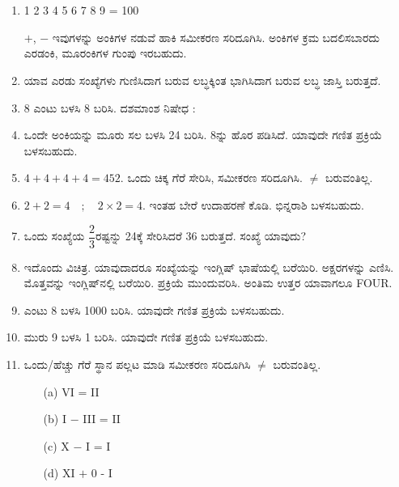 \chapter{}\label{chap8}

\begin{enumerate}
\renewcommand{\labelenumi}{\bf\theenumi.}
\itemsep=5pt

\item 1 2 3 4 5 6 7 8 9 = 100

$+$, $-$ ಇವುಗಳನ್ನು ಅಂಕಿಗಳ ನಡುವೆ ಹಾಕಿ ಸಮೀಕರಣ ಸರಿದೂಗಿಸಿ. ಅಂಕಿಗಳ ಕ್ರಮ ಬದಲಿಸಬಾರದು ಎರಡಂಕಿ, ಮೂರಂಕಿಗಳ ಗುಂಪು ಇರಬಹುದು. 

\item ಯಾವ ಎರಡು ಸಂಖ್ಯೆಗಳು ಗುಣಿಸಿದಾಗ ಬರುವ ಲಬ್ಧಕ್ಕಿಂತ ಭಾಗಿಸಿದಾಗ ಬರುವ ಲಬ್ಧ ಜಾಸ್ತಿ ಬರುತ್ತದೆ. 

\item 8 ಎಂಟು ಬಳಸಿ 8 ಬರಿಸಿ. ದಶಮಾಂಶ ನಿಷೇಧ :

\item ಒಂದೇ ಅಂಕಿಯನ್ನು ಮೂರು ಸಲ ಬಳಸಿ 24 ಬರಿಸಿ. 8ನ್ನು ಹೊರ ಪಡಿಸಿದೆ. ಯಾವುದೇ ಗಣಿತ ಪ್ರಕ್ರಿಯೆ ಬಳಸಬಹುದು. 

\item $4 + 4 + 4 + 4 = 452$. ಒಂದು ಚಿಕ್ಕ ಗೆರೆ ಸೇರಿಸಿ, ಸಮೀಕರಣ ಸರಿದೂಗಿಸಿ. $\neq$ ಬರುವಂತಿಲ್ಲ. 

\item $2 + 2 = 4\quad;\quad 2\times 2 = 4$. ಇಂತಹ ಬೇರೆ ಉದಾಹರಣೆ ಕೊಡಿ. ಭಿನ್ನರಾಶಿ ಬಳಸಬಹುದು. 

\item ಒಂದು ಸಂಖ್ಯೆಯ $\dfrac{2}{3}$ರಷ್ಟನ್ನು 24ಕ್ಕೆ ಸೇರಿಸಿದರೆ 36 ಬರುತ್ತದೆ. ಸಂಖ್ಯೆ ಯಾವುದು? 

\item ಇದೊಂದು ವಿಚಿತ್ರ. ಯಾವುದಾದರೂ ಸಂಖ್ಯೆಯನ್ನು ಇಂಗ್ಲಿಷ್ ಭಾಷೆಯಲ್ಲಿ ಬರೆಯಿರಿ. ಅಕ್ಷರಗಳನ್ನು ಎಣಿಸಿ. ಮೊತ್ತವನ್ನು ಇಂಗ್ಲಿಷ್‌ನಲ್ಲಿ ಬರೆಯಿರಿ. ಪ್ರಕ್ರಿಯೆ ಮುಂದುವರಿಸಿ. ಅಂತಿಮ ಉತ್ತರ ಯಾವಾಗಲೂ FOUR.

\item ಎಂಟು 8 ಬಳಸಿ 1000 ಬರಿಸಿ. ಯಾವುದೇ ಗಣಿತ ಪ್ರಕ್ರಿಯೆ ಬಳಸಬಹುದು. 

\item ಮುರು 9 ಬಳಸಿ 1  ಬರಿಸಿ. ಯಾವುದೇ ಗಣಿತ ಪ್ರಕ್ರಿಯೆ ಬಳಸಬಹುದು. 

\item ಒಂದು/ಹೆಚ್ಚು ಗೆರೆ ಸ್ಥಾನ ಪಲ್ಲಟ ಮಾಡಿ ಸಮೀಕರಣ ಸರಿದೂಗಿಸಿ $\neq$ ಬರುವಂತಿಲ್ಲ. 
\begin{itemize}
\item[(a)] VI = II
\item[(b)] I $-$ III = II
\item[(c)] X $-$ I = I
\item[(d)] XI $+$ 0 - I
\end{itemize}


\end{enumerate}
